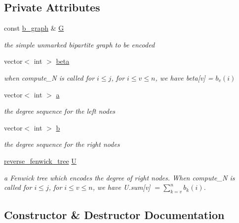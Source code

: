 \subsection*{Private Attributes}
\begin{DoxyCompactItemize}
\item 
const \hyperlink{classb__graph}{b\+\_\+graph} \& \hyperlink{classb__graph__encoder_af969e24f445db0e54513086604e2c165}{G}
\begin{DoxyCompactList}\small\item\em the simple unmarked bipartite graph to be encoded \end{DoxyCompactList}\item 
vector$<$ int $>$ \hyperlink{classb__graph__encoder_ae54d76cc4cee399d98951f870897a144}{beta}
\begin{DoxyCompactList}\small\item\em when compute\+\_\+N is called for $i \leq j$, for $ i \leq v \leq n$, we have beta\mbox{[}v\mbox{]} = $b_v(i)$ \end{DoxyCompactList}\item 
vector$<$ int $>$ \hyperlink{classb__graph__encoder_afd22d167f495cd85b41397f337c377c2}{a}
\begin{DoxyCompactList}\small\item\em the degree sequence for the left nodes \end{DoxyCompactList}\item 
vector$<$ int $>$ \hyperlink{classb__graph__encoder_a767826e268702e45ab71565e096a52b8}{b}
\begin{DoxyCompactList}\small\item\em the degree sequence for the right nodes \end{DoxyCompactList}\item 
\hyperlink{classreverse__fenwick__tree}{reverse\+\_\+fenwick\+\_\+tree} \hyperlink{classb__graph__encoder_ac810138443002a2b2cf579ced2dc34ce}{U}
\begin{DoxyCompactList}\small\item\em a Fenwick tree which encodes the degree of right nodes. When compute\+\_\+N is called for $i \leq j$, for $i \leq v \leq n$, we have U.\+sum\mbox{[}v\mbox{]} $= \sum_{k = v}^n b_k(i)$. \end{DoxyCompactList}\end{DoxyCompactItemize}


\subsection{Constructor \& Destructor Documentation}
\mbox{\label{classb__graph__encoder_a03c88fac38f7b125212a524af8dc84ed}} 
